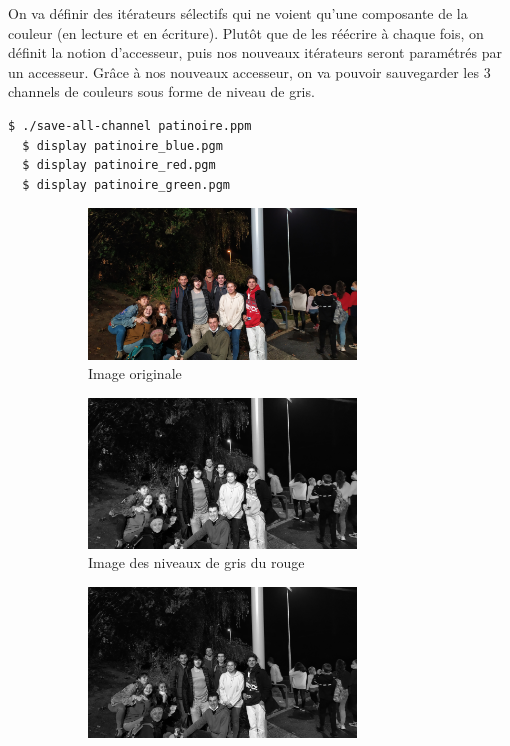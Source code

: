 \documentclass[a4paper,10pt]{article}
\begin{document}
    On va définir des itérateurs sélectifs qui ne voient qu'une composante de la couleur (en lecture et en écriture). Plutôt que de les réécrire à chaque fois, on définit la notion d'accesseur, puis nos nouveaux itérateurs seront paramétrés par un accesseur. Grâce à nos nouveaux accesseur, on va pouvoir sauvegarder les 3 channels de couleurs sous forme de niveau de gris.
    \begin{lstlisting}[language=Bash]
  $ ./save-all-channel patinoire.ppm
  $ display patinoire_blue.pgm
  $ display patinoire_red.pgm
  $ display patinoire_green.pgm
  \end{lstlisting}
    \begin{figure}[h]
   \begin{subfigure}{0.6\textwidth}
    \includegraphics[width=1\linewidth, height=4cm]{patinoire}
    \caption{Image originale}
    \label{fig:patinoireOrigin}
    \end{subfigure}
     \begin{subfigure}{0.6\textwidth}
    \includegraphics[width=1\linewidth, height=4cm]{patinoire_red}   
    \caption{Image des niveaux de gris du rouge}
    \label{fig:patinoireRed}
    \end{subfigure}
     \begin{subfigure}{0.6\textwidth}
    \includegraphics[width=1\linewidth, height=4cm]{patinoire_green}   

\end{subfigure}
\end{figure}
\end{document}
